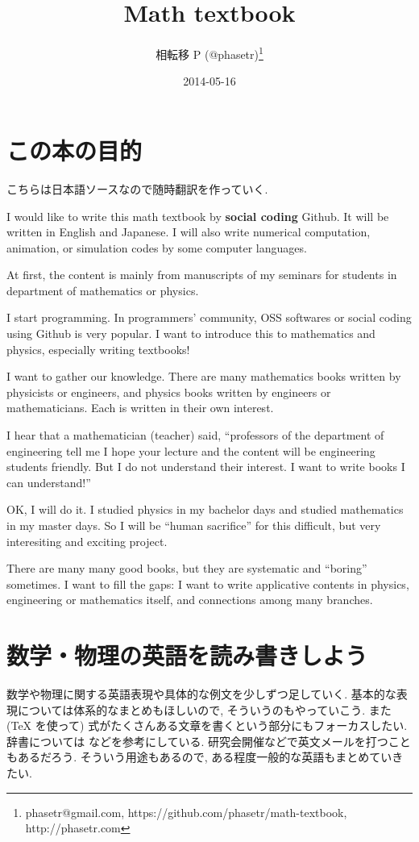 \documentclass[openany, a4paper, oneside]{book}
\title{Math textbook}
\author{相転移 P (@phasetr)\thanks{phasetr@gmail.com, https://github.com/phasetr/math-textbook, http://phasetr.com}}
\date{2014-05-16}
\theoremstyle{break}
\theoremstyle{breakdefn}
\begin{document}
\maketitle

\setcounter{tocdepth}{10}
\tableofcontents
\vspace*{1cm}

\part{この本の目的}
\label{sec-1}

こちらは日本語ソースなので随時翻訳を作っていく.

I would like to write this math textbook by \textbf{social coding} Github.
It will be written in English and Japanese.
I will also write numerical computation, animation,
or simulation codes by some computer languages.

At first, the content is mainly from manuscripts
of my seminars for students in department of mathematics or physics.

I start programming.
In programmers' community, OSS softwares or social coding using Github
is very popular.
I want to introduce this to mathematics and physics,
especially writing textbooks!

I want to gather our knowledge.
There are many mathematics books written by physicists or engineers,
and physics books written by engineers or mathematicians.
Each is written in their own interest.

I hear that a mathematician (teacher) said,
``professors of the department of engineering tell me
I hope your lecture and the content will be engineering students friendly.
But I do not understand their interest.
I want to write books I can understand!''

OK, I will do it.
I studied physics in my bachelor days and studied mathematics
in my master days.
So I will be ``human sacrifice'' for this difficult, but very
interesiting and exciting project.

There are many many good books,
but they are systematic and ``boring'' sometimes.
I want to fill the gaps:
I want to write applicative contents in physics, engineering or mathematics itself,
and connections among many branches.
\part{数学・物理の英語を読み書きしよう}
\label{sec-2}

数学や物理に関する英語表現や具体的な例文を少しずつ足していく.
基本的な表現については体系的なまとめもほしいので, そういうのもやっていこう.
また (\TeX{} を使って) 式がたくさんある文章を書くという部分にもフォーカスしたい.
辞書については \cite{YusakuKomatsu1} などを参考にしている.
研究会開催などで英文メールを打つこともあるだろう.
そういう用途もあるので, ある程度一般的な英語もまとめていきたい.
\end{document}

